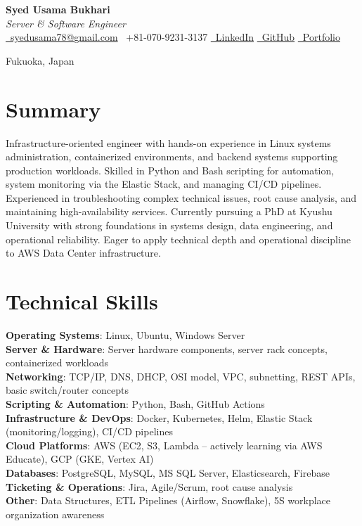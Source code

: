 \documentclass[a4paper,11pt]{article}
\makeatletter
\newcommand{\name}{\textbf{\huge Syed Usama Bukhari}}
\newcommand{\jobtitle}{\textit{Server \& Software Engineer}}
\newcommand{\contactinfo}{%
    \href{mailto:syedusama78@gmail.com}{\faEnvelope\ syedusama78@gmail.com} \hspace{0.5cm}
    \faPhone\ +81-070-9231-3137 \hspace{0.5cm}
    \href{https://www.linkedin.com/in/syed-usama-bukhari-0a6373175/}{\faLinkedin\ LinkedIn} \hspace{0.5cm}
    \href{https://github.com/usama-shiranai90}{\faGithub\ GitHub} \hspace{0.5cm}
    \href{https://usamabukhari.netlify.app/}{\faBriefcase\ Portfolio}
}
\makeatother
\begin{document}
\begin{center}
    {\name} \\[5pt]
    {\jobtitle} \\[10pt]
    {\contactinfo}

    {Fukuoka, Japan}
    
\end{center}

\section*{Summary}
Infrastructure-oriented engineer with hands-on experience in Linux systems administration, containerized environments, and backend systems supporting production workloads. Skilled in Python and Bash scripting for automation, system monitoring via the Elastic Stack, and managing CI/CD pipelines. Experienced in troubleshooting complex technical issues, root cause analysis, and maintaining high-availability services. Currently pursuing a PhD at Kyushu University with strong foundations in systems design, data engineering, and operational reliability. Eager to apply technical depth and operational discipline to AWS Data Center infrastructure.  

\section*{Technical Skills}
\textbf{Operating Systems}: Linux, Ubuntu, Windows Server \\
\textbf{Server \& Hardware}: Server hardware components, server rack concepts, containerized workloads \\
\textbf{Networking}: TCP/IP, DNS, DHCP, OSI model, VPC, subnetting, REST APIs, basic switch/router concepts \\
\textbf{Scripting \& Automation}: Python, Bash, GitHub Actions \\
\textbf{Infrastructure \& DevOps}: Docker, Kubernetes, Helm, Elastic Stack (monitoring/logging), CI/CD pipelines \\
\textbf{Cloud Platforms}: AWS (EC2, S3, Lambda -- actively learning via AWS Educate), GCP (GKE, Vertex AI) \\
\textbf{Databases}: PostgreSQL, MySQL, MS SQL Server, Elasticsearch, Firebase \\
\textbf{Ticketing \& Operations}: Jira, Agile/Scrum, root cause analysis \\
\textbf{Other}: Data Structures, ETL Pipelines (Airflow, Snowflake), 5S workplace organization awareness
\end{document}
